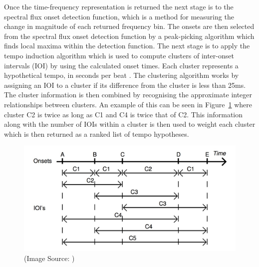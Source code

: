 \documentclass[a4paper, 11pt]{article}
\begin{document}
Once the time-frequency representation is returned the next stage is to the spectral flux onset detection function, which is a method for measuring the change in magnitude of each returned frequency bin\cite{dixon2}. The onsets are then selected from the spectral flux onset detection function by a peak-picking algorithm which finds local maxima within the detection function. The next stage is to apply the tempo induction algorithm which is used to compute clusters of inter-onset intervals (IOI) by using the calculated onset times. Each cluster represents a hypothetical tempo, in seconds per beat \cite{dixon1}. The clustering algorithm works by assigning an IOI to a cluster if its difference from the cluster is less than 25ms. The cluster information is then combined by recognising the approximate integer relationships between clusters. An example of this can be seen in Figure~\ref{fig: br-clusters} where cluster C2 is twice as long as C1 and C4 is twice that of C2. This information along with the number of IOIs within a cluster is then used to weight each cluster which is then returned as a ranked list of tempo hypotheses\cite{dixon4}.

\begin{figure}[ht]
	\centering
	\includegraphics[scale=0.25]{br-clusters}
	\caption{(Image Source: \cite{dixon4})}
	\label{fig: br-clusters}
\end{figure}
\end{document}
